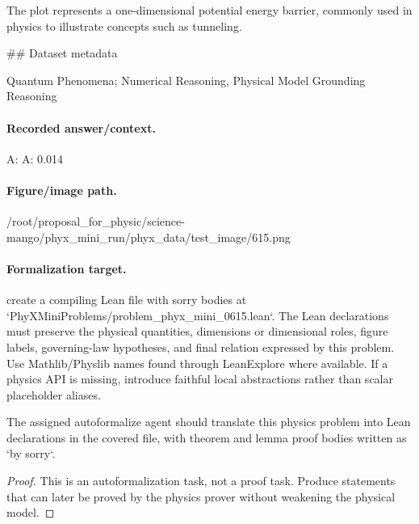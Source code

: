 The plot represents a one-dimensional potential energy barrier, commonly used in physics to illustrate concepts such as tunneling.

\#\# Dataset metadata

Quantum Phenomena; Numerical Reasoning, Physical Model Grounding Reasoning

\paragraph{Recorded answer/context.}
A: A: 0.014

\paragraph{Figure/image path.}
/root/proposal\_for\_physic/science-mango/phyx\_mini\_run/phyx\_data/test\_image/615.png

\paragraph{Formalization target.}
create a compiling Lean file with sorry bodies at `PhyXMiniProblems/problem\_phyx\_mini\_0615.lean`. The Lean declarations must preserve the physical quantities, dimensions or dimensional roles, figure labels, governing-law hypotheses, and final relation expressed by this problem.
Use Mathlib/Physlib names found through LeanExplore where available. If a physics API is missing, introduce faithful local abstractions rather than scalar placeholder aliases.

\begin{theorem}
\label{thm:physics:phyx_mini_0615:target}
The assigned autoformalize agent should translate this physics problem into Lean declarations in the covered file, with theorem and lemma proof bodies written as `by sorry`.
\end{theorem}
\begin{proof}
This is an autoformalization task, not a proof task. Produce statements that can later be proved by the physics prover without weakening the physical model.
\end{proof}

